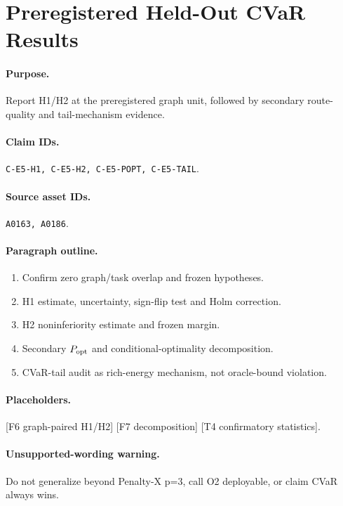 \section{Preregistered Held-Out CVaR Results}

\paragraph{Purpose.}
Report H1/H2 at the preregistered graph unit, followed by secondary route-quality
and tail-mechanism evidence.

\paragraph{Claim IDs.}
\texttt{C-E5-H1, C-E5-H2, C-E5-POPT, C-E5-TAIL}.

\paragraph{Source asset IDs.}
\texttt{A0163, A0186}.

\paragraph{Paragraph outline.}
\begin{enumerate}
  \item Confirm zero graph/task overlap and frozen hypotheses.
  \item H1 estimate, uncertainty, sign-flip test and Holm correction.
  \item H2 noninferiority estimate and frozen margin.
  \item Secondary $P_{\rm opt}$ and conditional-optimality decomposition.
  \item CVaR-tail audit as rich-energy mechanism, not oracle-bound violation.
\end{enumerate}

\paragraph{Placeholders.}
[F6 graph-paired H1/H2] [F7 decomposition] [T4 confirmatory statistics].

\paragraph{Unsupported-wording warning.}
Do not generalize beyond Penalty-X p=3, call O2 deployable, or claim CVaR always
wins.
